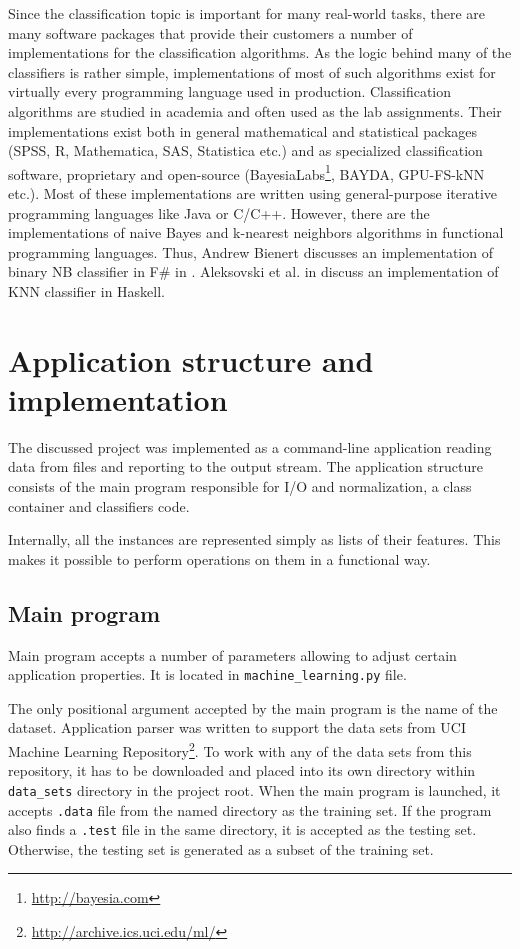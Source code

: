\documentclass{llncs}
\begin{document}
Since the classification topic is important for many real-world tasks, there are many software packages that provide their customers a number of implementations for the classification algorithms. As the logic behind many of the classifiers is rather simple, implementations of most of such algorithms exist for virtually every programming language used in production. Classification algorithms are studied in academia and often used as the lab assignments. Their implementations exist both in general mathematical and statistical packages (SPSS, R, Mathematica, SAS, Statistica etc.) and as specialized classification software, proprietary and open-source (BayesiaLabs\footnote{\url{http://bayesia.com}}, BAYDA\cite{Kontkanen}, GPU-FS-kNN\cite{Arefin} etc.). Most of these implementations are written using general-purpose iterative programming languages like Java or C/C++. However, there are the implementations of naive Bayes and k-nearest neighbors algorithms in functional programming languages. Thus, Andrew Bienert discusses an implementation of binary NB classifier in F\# in \cite{Bienert}. Aleksovski et al. in \cite{Aleksovski} discuss an implementation of KNN classifier in Haskell. 

\section{Application structure and implementation}

The discussed project was implemented as a command-line application reading data from files and reporting to the output stream. The application structure consists of the main program responsible for I/O and normalization, a class container and classifiers code. 

Internally, all the instances are represented simply as lists of their features. This makes it possible to perform operations on them in a functional way.

\subsection{Main program}

Main program accepts a number of parameters allowing to adjust certain application properties. It is located in \lstinline{machine_learning.py} file.

The only positional argument accepted by the main program is the name of the dataset. Application parser was written to support the data sets from UCI Machine Learning Repository\footnote{\url{http://archive.ics.uci.edu/ml/}}. To work with any of the data sets from this repository, it has to be downloaded and placed into its own directory within \lstinline{data_sets} directory in the project root. When the main program is launched, it accepts \lstinline{.data} file from the named directory as the training set. If the program also finds a \lstinline{.test} file in the same directory, it is accepted as the testing set. Otherwise, the testing set is generated as a subset of the training set.
\end{document}
